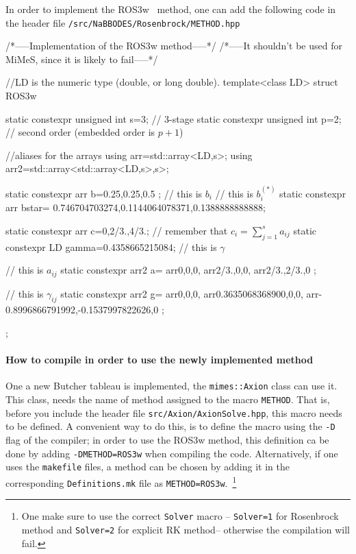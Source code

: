 \documentclass[11pt,a4paper]{article}
\begin{document}
In order to implement the ROS3w~\cite{RangAngermann2005} method, one can add the following code in the header file {\tt \mimes/src/NaBBODES/Rosenbrock/METHOD.hpp}
%
\begin{cpp}
	/*-----Implementation of the ROS3w method-----*/
	/*-----It shouldn't be used for MiMeS, since it is likely to fail-----*/
	
	
	//LD is the numeric type (\ie double, or long double).
	template<class LD>
	struct ROS3w{
		static constexpr unsigned int s=3; // 3-stage
		static constexpr unsigned int p=2; // second order (embedded order is $p+1$)
		
		//aliases for the arrays
		using arr=std::array<LD,s>;
		using arr2=std::array<std::array<LD,s>,s>;

		static constexpr arr b={0.25,0.25,0.5 };  // this is $b_i$
		// this is $b_i^{(*)}$
		static constexpr arr bstar={ 0.746704703274,0.1144064078371,0.1388888888888};  
		
		static constexpr arr c={0,2/3.,4/3.}; // remember that $c_i = \displaystyle\sum_{j=1}^{s} a_{ij}$
		static constexpr LD gamma=0.4358665215084; // this is $\gamma$
		
		// this is $a_{ij}$
		static constexpr arr2 a={
			arr{0,0,0},
			arr{2/3.,0,0},
			arr{2/3.,2/3.,0}	
		};
	
		// this is $\gamma_{ij}$	
		static constexpr arr2 g={
			arr{0,0,0},
			arr{0.3635068368900,0,0},
			arr{-0.8996866791992,-0.1537997822626,0}
		};
	};
\end{cpp}

\paragraph{How to compile \mimes in order to use the newly implemented method} One a new Butcher tableau is implemented, the {\tt mimes::Axion} class can use it. This class, needs the name of method assigned to the macro {\tt METHOD}. That is, before you include the header file {\tt src/Axion/AxionSolve.hpp}, this macro needs to be defined. A convenient way to do this, is to define the macro using the {\tt -D} flag of the compiler; \eg in order to use the ROS3w method, this definition ca be done by adding  {\tt -DMETHOD=ROS3w} when compiling the code. Alternatively, if one uses the {\tt makefile} files, a method can be chosen by adding it in the corresponding {\tt Definitions.mk} file as {\tt METHOD=ROS3w}.~\footnote{One make sure to use the correct {\tt Solver} macro -- {\tt Solver=1} for Rosenbrock method  and {\tt Solver=2} for explicit RK method-- otherwise the compilation will fail.} 
\end{document}
